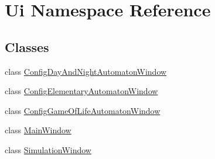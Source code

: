 \hypertarget{namespace_ui}{}\section{Ui Namespace Reference}
\label{namespace_ui}
\subsection*{Classes}
\begin{DoxyCompactItemize}
\item 
class \mbox{\hyperlink{class_ui_1_1_config_day_and_night_automaton_window}{Config\+Day\+And\+Night\+Automaton\+Window}}
\item 
class \mbox{\hyperlink{class_ui_1_1_config_elementary_automaton_window}{Config\+Elementary\+Automaton\+Window}}
\item 
class \mbox{\hyperlink{class_ui_1_1_config_game_of_life_automaton_window}{Config\+Game\+Of\+Life\+Automaton\+Window}}
\item 
class \mbox{\hyperlink{class_ui_1_1_main_window}{Main\+Window}}
\item 
class \mbox{\hyperlink{class_ui_1_1_simulation_window}{Simulation\+Window}}
\end{DoxyCompactItemize}
